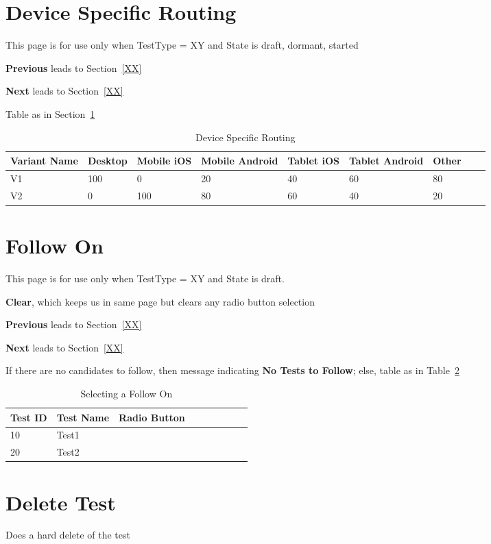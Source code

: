 \documentclass[letterpaper]{article}
\begin{document}
\section{Device Specific Routing}
\label{filters}
This page is for use only when TestType = XY and State is draft, dormant,
started
\be
\item {\bf Previous} leads to Section~\ref{XX}
\item {\bf Next} leads to Section~\ref{XX}
\item Table as in Section~\ref{tbl_device_specific}
  \ee
\begin{table}[hb]
\centering
\begin{tabular}{|l||l|l|l|l|l|l|l|l|}  \hline \hline
  {\bf Variant Name} & 
  {\bf Desktop} & 
  {\bf Mobile iOS}  &
  {\bf Mobile Android}  & 
  {\bf Tablet iOS}  & 
  Tablet {\bf Android}  &
  Other \\ \hline \hline
  V1 & 100  & 0   & 20 & 40 & 60 & 80 \\ \hline
  V2 & 0    & 100 &  80 & 60 & 40 & 20 \\ \hline
\hline
\end{tabular}
\caption{Device Specific Routing}
\label{tbl_device_specific}
\end{table}

\section{Follow On}
This page is for use only when TestType = XY and State is draft.
\be
\item {\bf Clear}, which keeps us in same page but clears any radio button
  selection
\item {\bf Previous} leads to Section~\ref{XX}
\item {\bf Next} leads to Section~\ref{XX}
\item If there are no candidates to follow, then message indicating {\bf No
  Tests to Follow}; else, table as in Table~\ref{tbl_follow_on}
  \ee

\begin{table}[hb]
\centering
\begin{tabular}{|l||l|l|l|l|l|l|l|l|}  \hline \hline
  {\bf Test ID } & {\bf Test Name} & {\bf Radio Button}\\ \hline 
  10 & Test1 & \\ \hline
  20 & Test2 & \\ \hline
\hline
\end{tabular}
\caption{Selecting a Follow On}
\label{tbl_follow_on}
\end{table}


\section{Delete Test}
\label{del_test}

Does a hard delete of the test 
\end{document}
